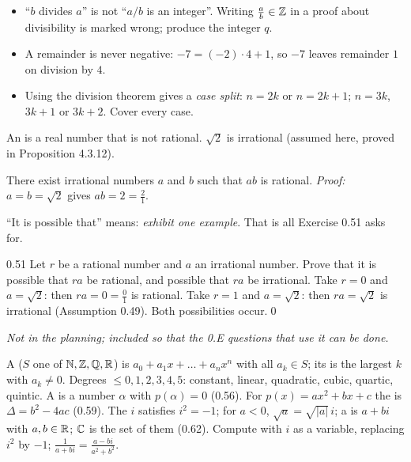 \begin{warn}
\begin{itemize}
\item ``$b$ divides $a$'' is not ``$a/b$ is an integer''. Writing $\frac ab\in\mathbb{Z}$ in a proof about divisibility is marked wrong; produce the integer $q$.
\item A remainder is never negative: $-7=(-2)\cdot4+1$, so $-7$ leaves remainder $1$ on division by $4$.
\item Using the division theorem gives a \emph{case split}: $n=2k$ or $n=2k+1$; $n=3k$, $3k+1$ or $3k+2$. Cover every case.
\end{itemize}
\end{warn}


\begin{key}
An  is a real number that is not rational. $\sqrt2$ is irrational (assumed here, proved in Proposition 4.3.12).
\end{key}

\begin{result}[{Proposition 0.50}]
There exist irrational numbers $a$ and $b$ such that $ab$ is rational. \emph{Proof:} $a=b=\sqrt2$ gives $ab=2=\frac21$.
\end{result}
``It is possible that'' means: \emph{exhibit one example}. That is all Exercise 0.51 asks for.

\begin{bookex}[recommended]{0.51}
Let $r$ be a rational number and $a$ an irrational number. Prove that it is possible that $ra$ be rational, and possible that $ra$ be irrational.
\solution
Take $r=0$ and $a=\sqrt2$: then $ra=0=\frac01$ is rational. Take $r=1$ and $a=\sqrt2$: then $ra=\sqrt2$ is irrational (Assumption 0.49). Both possibilities occur.\qed
\end{bookex}


\emph{Not in the planning; included so that the 0.E questions that use it can be done.}

\begin{key}[{Definitions 0.52--0.62}]
A  ($S$ one of $\mathbb{N},\mathbb{Z},\mathbb{Q},\mathbb{R}$) is $a_0+a_1x+\dots+a_nx^n$ with all $a_k\in S$; its  is the largest $k$ with $a_k\ne0$. Degrees $\le0,1,2,3,4,5$: constant, linear, quadratic, cubic, quartic, quintic. A  is a number $\alpha$ with $p(\alpha)=0$ (0.56). For $p(x)=ax^2+bx+c$ the  is $\Delta=b^2-4ac$ (0.59). The  $i$ satisfies $i^2=-1$; for $a<0$, $\sqrt a=\sqrt{|a|}\,i$; a  is $a+bi$ with $a,b\in\mathbb{R}$; $\mathbb{C}$ is the set of them (0.62). Compute with $i$ as a variable, replacing $i^2$ by $-1$; $\frac1{a+bi}=\frac{a-bi}{a^2+b^2}$.
\end{key}

